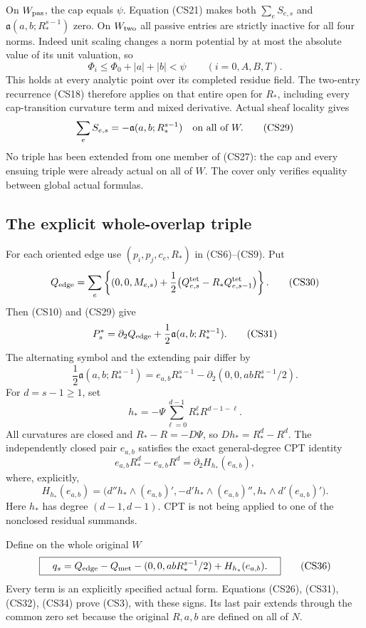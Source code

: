 On $W_{\rm pas}$, the cap equals $\psi$.  Equation (CS21) makes
both $\sum_eS_{e,s}$ and $\mathfrak a(a,b;R_*^{s-1})$ zero.
On $W_{\rm two}$ all passive entries are strictly inactive for
all four norms.  Indeed unit scaling changes a norm potential
by at most the absolute value of its unit valuation, so
\[
                 \Phi_i\le\Phi_0+|a|+|b|<\psi
                              \qquad(i=0,A,B,T).
 \tag{CS28}
\]
This holds at every analytic point over its completed residue
field.  The two-entry recurrence (CS18) therefore applies on
that entire open for $R_*$, including every cap-transition
curvature term and mixed derivative.  Actual sheaf locality gives
\[
                   \sum_eS_{e,s}=-\mathfrak a(a,b;R_*^{s-1})
                                      \quad\hbox{on all of }W.
 \tag{CS29}
\]
No triple has been extended from one member of (CS27): the cap
and every ensuing triple were already actual on all of $W$.
The cover only verifies equality between global actual formulas.

\subsection{The explicit whole-overlap triple}

For each oriented edge use $(p_i,p_j,c_e,R_*)$ in (CS6)--(CS9).
Put
\[
 Q_{\rm edge}=\sum_e\left\{(0,0,M_{e,s})+\frac12
     \bigl(Q_{e,s}^{\mathrm{tet}}-R_*Q_{e,s-1}^{\mathrm{tet}}\bigr)
                                                       \right\}.
 \tag{CS30}
\]
Then (CS10) and (CS29) give
\[
 P_s^*=\partial_2Q_{\rm edge}
                 +\frac12\mathfrak a(a,b;R_*^{s-1}).
 \tag{CS31}
\]
The alternating symbol and the extending pair differ by
\[
 \frac12\mathfrak a(a,b;R_*^{s-1})
       =e_{a,b}R_*^{s-1}
                   -\partial_2(0,0,abR_*^{s-1}/2).
 \tag{CS32}
\]
For $d=s-1\ge1$, set
\[
                h_*=-\Psi\sum_{\ell=0}^{d-1}R_*^\ell R^{d-1-\ell}.
 \tag{CS33}
\]
All curvatures are closed and $R_*-R=-D\Psi$, so
$Dh_*=R_*^d-R^d$.  The independently closed pair $e_{a,b}$
satisfies the exact general-degree CPT identity
\[
                 e_{a,b}R_*^d-e_{a,b}R^d
                                      =\partial_2H_{h_*}(e_{a,b}),
 \tag{CS34}
\]
where, explicitly,
\[
 H_{h_*}(e_{a,b})=
 \bigl(d''h_*\wedge(e_{a,b})',
       -d'h_*\wedge(e_{a,b})'',
                        h_*\wedge d'(e_{a,b})'\bigr).
 \tag{CS35}
\]
Here $h_*$ has degree $(d-1,d-1)$.  CPT is not being applied
to one of the nonclosed residual summands.

Define on the whole original $W$
\[
 \boxed{\quad
 q_s=Q_{\rm edge}-Q_{\rm met}
           -(0,0,abR_*^{s-1}/2)+H_{h_*}(e_{a,b}).
 \quad}
 \tag{CS36}
\]
Every term is an explicitly specified actual form.  Equations
(CS26), (CS31), (CS32), (CS34) prove (CS3), with these signs.
Its last pair extends through the common zero set because the
original $R,a,b$ are defined on all of $N$.

